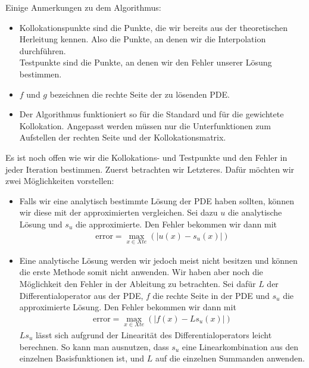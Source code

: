 Einige Anmerkungen zu dem Algorithmus:
\begin{itemize}
\item
Kollokationspunkte sind die Punkte, die wir bereits aus der theoretischen Herleitung kennen. Also die Punkte, an denen wir die Interpolation durchführen.\\
Testpunkte sind die Punkte, an denen wir den Fehler unserer Lösung bestimmen.
\item
$f$ und $g$ bezeichnen die rechte Seite der zu lösenden \gls{PDE}.
\item
Der Algorithmus funktioniert so für die Standard und für die gewichtete Kollokation. Angepasst werden müssen nur die Unterfunktionen zum Aufstellen der rechten Seite und der Kollokationsmatrix.
\end{itemize}
Es ist noch offen wie wir die Kollokations- und Testpunkte und den Fehler in jeder Iteration bestimmen. Zuerst betrachten wir Letzteres. Dafür möchten wir zwei Möglichkeiten vorstellen:
\begin{itemize}
\item
Falls wir eine analytisch bestimmte Lösung der \gls{PDE} haben sollten, können wir diese mit der approximierten vergleichen. Sei dazu $u$ die analytische Lösung und $s_u$ die approximierte. Den Fehler bekommen wir dann mit
\begin{align*}
\mathrm{error} = \max_{x \in Xte} \left(\left| u(x) - s_u(x) \right| \right)
\end{align*}
\item
Eine analytische Lösung werden wir jedoch meist nicht besitzen und können die erste Methode somit nicht anwenden. Wir haben aber noch die Möglichkeit den Fehler in der Ableitung zu betrachten. Sei dafür $L$ der Differentialoperator aus der \gls{PDE}, $f$ die rechte Seite in der \gls{PDE} und $s_u$ die approximierte Lösung. Den Fehler bekommen wir dann mit
\begin{align*}
\mathrm{error} = \max_{x \in Xte} \left(\left| f(x) - L s_u(x) \right| \right)
\end{align*}
$Ls_u$ lässt sich aufgrund der Linearität des Differentialoperators leicht berechnen. So kann man ausnutzen, dass $s_u$ eine Linearkombination aus den einzelnen Basisfunktionen ist, und $L$ auf die einzelnen Summanden anwenden.
\end{itemize}

